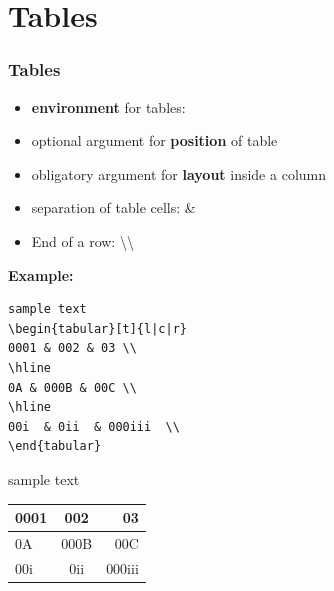 \section{Tables}

\begin{frame}[fragile]
\frametitle{Tables}

\begin{itemize}
	\item \textbf{environment} for tables:  
	\item optional argument for \textbf{position} of table
	\item obligatory argument for \textbf{layout} inside a column
	\item separation of table cells: \& 
	\item End of a row: \textbackslash\textbackslash 
\end{itemize}


\pause 

\textbf{Example:}

\begin{multicols}{2}
	
\begin{lstlisting}
sample text	
\begin{tabular}[t]{l|c|r}
0001 & 002 & 03 \\
\hline
0A & 000B & 00C \\
\hline
00i  & 0ii  & 000iii  \\
\end{tabular}
\end{lstlisting}
	
	\columnbreak
	
sample text	
	\begin{tabular}[t]{l|c|r}
		0001 & 002 & 03 \\
		\hline
		0A & 000B & 00C \\
		\hline
		00i  & 0ii  & 000iii  \\
	\end{tabular}
\end{multicols}

\end{frame}


